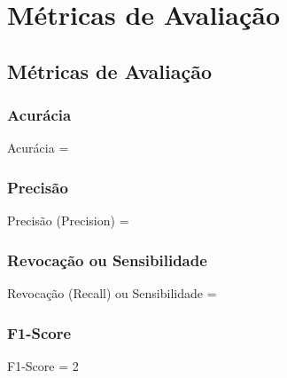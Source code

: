 
\chapter{Métricas de Avaliação}
\label{cap:metricas-de-avaliacao}

\section{Métricas de Avaliação}

\subsection{Acurácia}

\begin{equacaodestaque}{Acurácia}
     = 
    \label{eq:acuracia}
\end{equacaodestaque}

\subsection{Precisão}

\begin{equacaodestaque}{Precisão (Precision)}
     = 
    \label{eq:precisao}
\end{equacaodestaque}

\subsection{Revocação ou Sensibilidade}

\begin{equacaodestaque}{Revocação (Recall) ou Sensibilidade}
     = 
    \label{eq:revocacao}
\end{equacaodestaque}

\subsection{F1-Score}

\begin{equacaodestaque}{F1-Score}
     = 2 \times {}
    \label{eq:f1_score}
\end{equacaodestaque}


